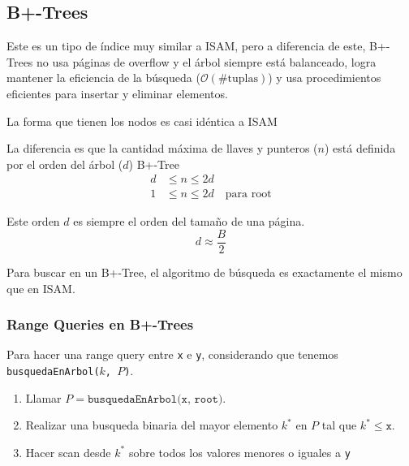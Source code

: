 \subsection{B+-Trees}
Este es un tipo de índice muy similar a ISAM, pero a diferencia de este, B+-Trees no usa páginas de overflow y el árbol siempre está balanceado, logra mantener la eficiencia de la búsqueda ($\mathcal{O}(\#\text{tuplas})$) y usa procedimientos eficientes para insertar y eliminar elementos.

La forma que tienen los nodos es casi idéntica a ISAM
\begin{figure}[h]
  \centering
\end{figure}

La diferencia es que la cantidad máxima de llaves y punteros ($n$) está definida por el orden del árbol ($d$) B+-Tree
\begin{align*}
  d &\leq n \leq 2d\\
  1 &\leq n \leq 2d \quad \text{para root}
\end{align*}

Este orden $d$ es siempre el orden del tamaño de una página.
\[ d \approx \frac{B}{2} \]

Para buscar en un B+-Tree, el algoritmo de búsqueda es exactamente el mismo que en ISAM.

\subsubsection{Range Queries en B+-Trees}
Para hacer una range query entre \texttt{x} e \texttt{y}, considerando que tenemos \texttt{busquedaEnArbol($k$, $P$)}.
\begin{enumerate}
  \item Llamar $P = \texttt{busquedaEnArbol(x, root)}$.
  \item Realizar una busqueda binaria del mayor elemento $k^*$ en $P$ tal que $k^* \leq \texttt{x}$.
  \item Hacer scan desde $k^*$ sobre todos los valores menores o iguales a \texttt{y}
\end{enumerate}

